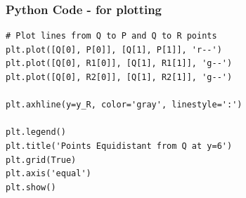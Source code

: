 \documentclass{beamer}
\theoremstyle{remark}
\begin{document}
\begin{frame}[fragile]
    \frametitle{Python Code - for plotting}
    \begin{lstlisting}
# Plot lines from Q to P and Q to R points
plt.plot([Q[0], P[0]], [Q[1], P[1]], 'r--')
plt.plot([Q[0], R1[0]], [Q[1], R1[1]], 'g--')
plt.plot([Q[0], R2[0]], [Q[1], R2[1]], 'g--')

plt.axhline(y=y_R, color='gray', linestyle=':')

plt.legend()
plt.title('Points Equidistant from Q at y=6')
plt.grid(True)
plt.axis('equal')
plt.show()

\end{lstlisting}
\end{frame}
\end{document}

